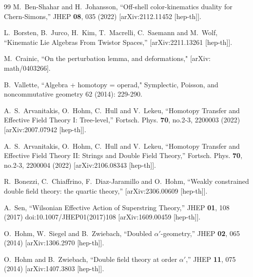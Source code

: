 \documentclass[12pt]{article}\pdfoutput=1
\begin{document}
\begin{thebibliography}{99}
M.~Ben-Shahar and H.~Johansson,
``Off-shell color-kinematics duality for Chern-Simons,''
JHEP \textbf{08}, 035 (2022)
[arXiv:2112.11452 [hep-th]].



L.~Borsten, B.~Jurco, H.~Kim, T.~Macrelli, C.~Saemann and M.~Wolf,
``Kinematic Lie Algebras From Twistor Spaces,''
[arXiv:2211.13261 [hep-th]].


M.~Crainic, 
``On the perturbation lemma, and deformations," 
[arXiv: math/0403266]. 

B.~Vallette,  ``Algebra + homotopy = operad," 
Symplectic, Poisson, and noncommutative geometry 62 (2014): 229-290.


A.~S.~Arvanitakis, O.~Hohm, C.~Hull and V.~Lekeu,
``Homotopy Transfer and Effective Field Theory I: Tree-level,''
Fortsch. Phys. \textbf{70}, no.2-3, 2200003 (2022)
[arXiv:2007.07942 [hep-th]].

A.~S.~Arvanitakis, O.~Hohm, C.~Hull and V.~Lekeu,
``Homotopy Transfer and Effective Field Theory II: Strings and Double Field Theory,''
Fortsch. Phys. \textbf{70}, no.2-3, 2200004 (2022)
[arXiv:2106.08343 [hep-th]].


R.~Bonezzi, C.~Chiaffrino, F.~Diaz-Jaramillo and O.~Hohm,
``Weakly constrained double field theory: the quartic theory,''
[arXiv:2306.00609 [hep-th]].


A.~Sen,
``Wilsonian Effective Action of Superstring Theory,''
JHEP \textbf{01}, 108 (2017)
doi:10.1007/JHEP01(2017)108
[arXiv:1609.00459 [hep-th]].

O.~Hohm, W.~Siegel and B.~Zwiebach,
``Doubled $\alpha'$-geometry,''
JHEP \textbf{02}, 065 (2014)
[arXiv:1306.2970 [hep-th]].

O.~Hohm and B.~Zwiebach,
``Double field theory at order $\alpha'$,''
JHEP \textbf{11}, 075 (2014)
[arXiv:1407.3803 [hep-th]].


 \end{thebibliography}
\end{document}
